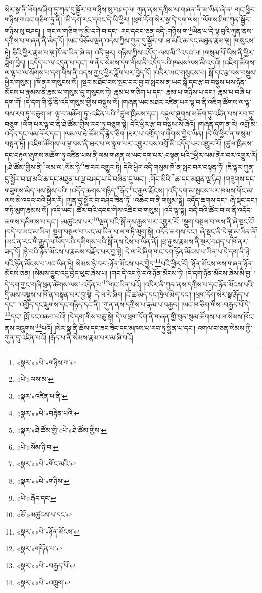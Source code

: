 སེར་སྣ་ནི་ལོགས་ཤིག་ཏུ་ཀུན་དུ་སྦྱོར་བ་གཉིས་སུ་བཤད་ལ། ཀུན་ནས་དཀྲིས་པ་གཞན་ནི་མ་ཡིན་ཞེ་ན། གང་ཕྱིར་གཉིས་ཀའང་གཅིག་ཏུ་ནི། །མི་དགེ་རང་དབང་དེ་ཡི་ཕྱིར། །ཕྲག་དོག་སེར་སྣ་དེ་དག་ལས། །ལོགས་ཤིག་ཀུན་སྦྱོར་གཉིས་སུ་བཤད། །
གང་ལ་གཅིག་ཏུ་མི་དགེ་བ་དང་། རང་དབང་ཅན་འདི་:གཉིས་ག་\footnote{«སྣར་»«པེ་»གཉིས་ཀ་}ཡིན་པ་དེ་ལྟ་བུའི་ཀུན་ནས་དཀྲིས་པ་གཞན་ནི་མེད་དོ། །ཡང་བཅོམ་ལྡན་འདས་ཀྱིས་ཀུན་དུ་སྦྱོར་བ། ཐ་མའི་ཆ་དང་མཐུན་རྣམ་ལྔ། །གསུངས་ཏེ། ཅིའི་ཕྱིར་རྣམ་པ་ལྔ་ཁོ་ན་ཡིན་ཞེ་ན། འདི་ལྟར། གཉིས་ཀྱིས་འདོད་:ལས་མི་\footnote{«པེ་»ལས་མ་}འདའ་ལ། །གསུམ་པོ་ཡིས་ནི་ཕྱིར་ཟློག་བྱེད། །འདོད་པ་ལ་འདུན་པ་དང་། གནོད་སེམས་དག་གིས་ནི་འདོད་པའི་ཁམས་ལས་མི་འདའོ། །འཇིག་ཚོགས་ལ་ལྟ་བ་ལ་སོགས་པ་དག་གིས་ནི་འདས་ཀྱང་ཕྱིར་ཟློག་པར་བྱེད་དོ། །འདིར་ཡང་གསུངས་པ། སྒོ་དང་རྩ་བས་བསྡུས་ཕྱིར་གསུམ། །ཁོ་ནར་གསུངས་སོ། །སྔར་མཐོང་བས་སྤང་བར་བྱ་བ་སྤངས་ན་ཡང་སྒོ་དང་རྩ་བ་བསྡུས་པས་ཉོན་མོངས་པ་རྣམས་ནི་རྣམ་པ་གསུམ་དུ་གསུངས་ཏེ། རྣམ་པ་གཅིག་པ་དང་། རྣམ་པ་གཉིས་པ་དང་། རྣམ་པ་བཞི་པ་དག་གོ། །དེ་དག་གི་སྒོ་ནི་འདི་གསུམ་གྱིས་བསྡུས་སོ། །གཞན་ཡང་མཐར་འཛིན་པར་ལྟ་བ་ནི་འཇིག་ཚོགས་ལ་ལྟ་བས་རབ་ཏུ་བཅུག་ལ། ལྟ་བ་མཆོག་ཏུ་:འཛིན་པའི་\footnote{«སྣར་»འཛིན་པ་ནི་}ཚུལ་ཁྲིམས་དང་། བརྟུལ་ཞུགས་མཆོག་ཏུ་འཛིན་པས་རབ་ཏུ་བཅུག །ལོག་པར་ལྟ་བ་ནི་ཐེ་ཚོམ་གྱིས་རབ་ཏུ་བཅུག་སྟེ། དེའི་ཕྱིར་རྩ་བ་བསྡུས་སོ་ཞེའོ། །གཞན་དག་ན་རེ། འགྲོ་མི་འདོད་དང་ལམ་ནོར་དང་། །ལམ་ལ་ཐེ་ཚོམ་དེ་རྙེད་ཅིག །ཐར་པ་བགྲོད་ལ་གེགས་བྱེད་ཡིན། །དེ་ཡི་ཕྱིར་ན་གསུམ་བསྟན་ཏོ། །འཇིག་ཚོགས་ལ་ལྟ་བས་ནི་ཐར་པ་ལ་སྐྲག་པར་འགྱུར་བས་འགྲོ་མི་འདོད་པར་འགྱུར་རོ། །ཚུལ་ཁྲིམས་དང་བརྟུལ་ཞུགས་མཆོག་ཏུ་འཛིན་པས་ནི་ལམ་གཞན་ལ་ཡང་དག་པར་:བསྟན་པའི་\footnote{«སྣར་»«པེ་»བརྟེན་པའི་}ཕྱིར་ལམ་ནོར་བར་འགྱུར་རོ། །:ཐེ་ཚོམ་གྱིས་ནི་\footnote{«སྣར་»ཐེ་ཚོམ་གྱི་«པེ་»ཐེ་ཚོམ་གྱིས་}ལམ་ལ་:སོམ་ཉི་\footnote{«པེ་»སོམ་ཉི་བ་}ཟ་བར་འགྱུར་ཏེ། དེའི་ཕྱིར་འདི་གསུམ་ཁོ་ན་སྤང་བར་བསྟན་ཏོ། །ཇི་ལྟར་ཀུན་དུ་སྦྱོར་བ་ཐ་མའི་ཆ་དང་མཐུན་པ་ལྔ་བཤད་པ་དེ་བཞིན་དུ་ཡང་། :གོང་མིའི་\footnote{«སྣར་»«པེ་»གོང་མའི་}ཆ་དང་མཐུན་ལྔ་ཉིད། །གཟུགས་དང་གཟུགས་མེད་ལས་སྐྱེས་པའི། །འདོད་ཆགས་གཉིད་\footnote{«སྣར་»«པེ་»གཉིས་}རྒོད་\footnote{«པེ་»རྒོད་དང་}ང་རྒྱལ་རྨོངས། །འདི་དག་མ་སྤངས་པར་ཁམས་གོང་མ་ལས་མི་འདའ་བའི་ཕྱིར་རོ། །ཀུན་དུ་སྦྱོར་བ་བཤད་ཟིན་ཏོ། །འཆིང་བ་ནི་གསུམ་སྟེ། འདོད་ཆགས་དང་། ཞེ་སྡང་དང་། གཏི་མུག་རྣམས་སོ། །འདི་ཡང་། ཚོར་བའི་དབང་གིས་འཆིང་བ་གསུམ། །འདི་ལྟ་སྟེ། བདེ་བའི་ཚོར་བ་ལ་ནི་འདོད་ཆགས་དམིགས་པ་དང་། :མཚུངས་པར་\footnote{«ཅོ་»མཚུངས་པ་དང་}ལྡན་པའི་སྒོ་ནས་རྒྱས་པར་འགྱུར་རོ། །སྡུག་བསྔལ་བ་ལས་ནི་ཞེ་སྡང་ངོ། །བདེ་བ་ཡང་མ་ཡིན། སྡུག་བསྔལ་བ་ཡང་མ་ཡིན་པ་ལ་གཏི་མུག་སྟེ། འདོད་ཆགས་དང་། ཞེ་སྡང་ནི་དེ་ལྟ་མ་ཡིན་ནོ། །ཡང་ན་རང་གི་རྒྱུད་ལ་ཡོད་པའི་དམིགས་པའི་སྒོ་ནས་ངེས་པ་ཡིན་ནོ། །ཕྲ་རྒྱས་རྣམས་ནི་སྔར་བཤད་པ་ཁོ་ནར་ཟད་དོ། །ཉེ་བའི་ཉོན་མོངས་པ་རྣམས་བརྗོད་པར་བྱ་སྟེ། དེ་ལ་རེ་ཞིག་གང་དག་ཉོན་མོངས་པ་ཡིན་པ་དེ་དག་ནི་ཉེ་བའི་ཉོན་མོངས་པ་ཡང་ཡིན་ཏེ། སེམས་ཉེ་བར་:ཉོན་མོངས་པར་བྱེད་\footnote{«སྣར་»«པེ་»ཉོན་མོངས་}པའི་ཕྱིར་རོ། །ཉོན་མོངས་ལས་གཞན་ཉོན་མོངས་ཅན། །སེམས་བྱུང་འདུ་བྱེད་ཕུང་ཞེས་པ། །གང་དེ་འང་ཉེ་བའི་ཉོན་མོངས་ཏེ། །དེ་དག་ཉོན་མོངས་ཞེས་མི་བྱ། །དེ་དག་ཀྱང་གཞི་ཕྲན་ཚེགས་ལས་:འདོན་པ་\footnote{«སྣར་»གདོན་པ་}གང་ཡིན་པའོ། །འདིར་ནི་ཀུན་ནས་དཀྲིས་པ་དང་ཉོན་མོངས་པའི་དྲི་མས་བསྡུས་པ་ཁོ་ན་བསྟན་པར་བྱ་སྟེ། དེ་ལ་རེ་ཞིག །ངོ་ཚ་མེད་དང་ཁྲེལ་མེད་དང་། །ཕྲག་དོག་སེར་སྣ་རྒོད་པ་དང་། །འགྱོད་དང་རྨུགས་དང་གཉིད་དང་ནི། །ཀུན་ནས་དཀྲིས་པ་རྣམ་པ་བརྒྱད། །ཡང་ཁ་ཅིག་གིས་:བརྒྱད་པོ་དེ་\footnote{«སྣར་»«པེ་»བརྒྱད་པོ་}དང་། ཁྲོ་དང་འཆབ་པའོ། །དེ་དག་གིས་བཅུ་སྟེ། དེ་ལ་ཕྲག་དོག་ནི་གཞན་གྱི་ཕུན་སུམ་ཚོགས་པ་ལ་སེམས་ཁོང་ནས་འཁྲུགས་\footnote{«སྣར་»«པེ་»འཁྲུག་}པའོ། །སེར་སྣ་ནི་ཆོས་དང་ཟང་ཟིང་དང་མཁས་པ་རབ་ཏུ་སྦྱིན་པ་དང་། འགལ་བ་ཅན་སེམས་ཀྱི་ཀུན་དུ་འཛིན་པའོ། །རྒོད་པ་ནི་སེམས་རྣམ་པར་མ་ཞི་བའོ། 